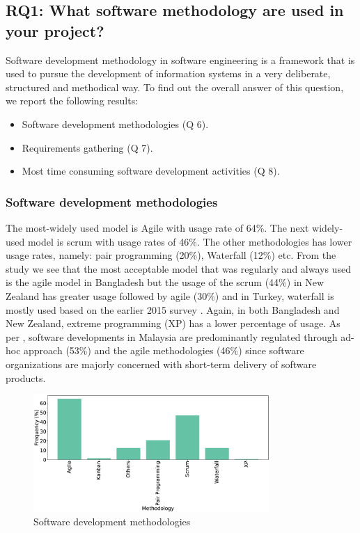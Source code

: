 \subsection{RQ1: What software methodology are used in your project?}
\label{RQ1}

Software development methodology in software engineering is a framework that is used to pursue the development of information systems in a very deliberate, structured and methodical way. To find out the overall answer of this question, we report the following results:
\begin{itemize}
\item Software development methodologies (Q 6).
\item Requirements gathering (Q 7).
\item Most time consuming software development activities (Q 8).
\end{itemize}


\subsubsection{Software development methodologies}
The most-widely used model is Agile with usage rate of 64\%. The next widely-used model is scrum with usage rates of 46\%. The other methodologies has lower usage rates, namely: pair programming (20\%), Waterfall (12\%) etc. From the study we see that the most acceptable model that was regularly and always used is the agile model in Bangladesh but the usage of the scrum (44\%) in New Zealand has greater usage followed by agile (30\%) \cite{Wang2018} and in Turkey, waterfall is mostly used based on the earlier 2015 survey \cite{Garousi2015}. Again, in both Bangladesh and New Zealand, extreme programming (XP) has a lower percentage of usage. As per \cite{Malek2015}, software developments in Malaysia are predominantly regulated through ad-hoc approach (53\%) and the agile methodologies (46\%) since software organizations are majorly concerned with short-term delivery of software products.

\begin{figure}[htbp]
\centering
  \includegraphics[width=0.8\textwidth]{Figures/Respondents_Methodology}
  \caption{Software development methodologies}
  \label{fig:methodologies}
\end{figure}

